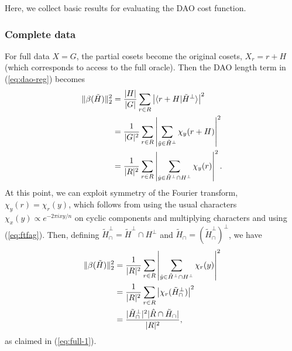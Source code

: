 \documentclass[aps, pre,reprint,nofootinbib,citeautoscript,floatfix]{revtex4-1}
\begin{document}
Here, we collect basic results for evaluating the DAO cost function.

\subsubsection*{Complete data}
\label{sec:choice-dcota-regul}

For full data $X = G$, the partial cosets become the original cosets, $X_r = r + H$ (which corresponds to access to the full oracle).
Then the DAO length term in (\ref{eq:dao-reg}) becomes
\begin{align}
  \Vert \beta(\tilde{H})\Vert_2^2  & = \frac{|H|}{|G|}\sum_{r\in R}\left|\langle r+H|\tilde{H}^\perp\rangle\right|^2 \notag \\ & = \frac{1}{|G|^2}\sum_{r\in R}\left|\sum_{\hat{y}\in
    \tilde{H}^\perp}\chi_y(r + H)\right|^2 \notag \\
  & = \frac{1}{|R|^2}\sum_{r\in R}\left|\sum_{\hat{y}\in
    \tilde{H}^\perp\cap H^\perp}\chi_y(r)\right|^2.
\end{align} 
At this point, we can exploit symmetry of the Fourier transform, $\chi_y(r) = \chi_r(y)$, which follows from using the usual characters $\chi_x(y)\propto e^{-2\pi i xy/n}$ on cyclic components and multiplying characters and using (\ref{eq:ftfag}). Then, defining $\tilde{H}_\cap^\perp = \tilde{H}^\perp \cap H^\perp$ and $\tilde{H}_\cap = (\tilde{H}_\cap^\perp)^\perp$, we have
\begin{align}
  \Vert \beta(\tilde{H})\Vert_2^2
  & = \frac{1}{|R|^2}\sum_{r\in R}\left|\sum_{\hat{y}\in
    \tilde{H}^\perp\cap H^\perp}\chi_r(y)\right|^2 \notag \\
    & = \frac{1}{|R|^2}\sum_{r\in R}\left|\chi_r(\tilde{H}_\cap^\perp)\right|^2 \notag \\
    & = \frac{|\tilde{H}_\cap^\perp|^2 |\hat{R} \cap \tilde{H}_\cap|}{|R|^2},
\end{align} 
as claimed in (\ref{eq:full-1}).
\end{document}
